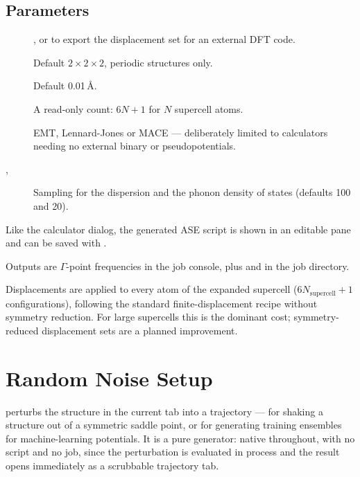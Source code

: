 \subsection{Parameters}

\begin{description}
  \item[] , or
     to export the
    displacement set for an external DFT code.
  \item[] Default $2\times2\times2$,
    periodic structures only.
  \item[] Default 0.01\,\AA.
  \item[] A read-only count: $6N+1$ for $N$
    supercell atoms.
  \item[] EMT, Lennard-Jones or MACE --- deliberately
    limited to calculators needing no external binary or pseudopotentials.
  \item[, ] Sampling for the dispersion
    and the phonon density of states (defaults 100 and 20).
\end{description}

Like the calculator dialog, the generated ASE script is shown in an
editable pane and can be saved with .

Outputs are $\Gamma$-point frequencies in the job console, plus
 and  in the job directory.

\begin{calnote}
Displacements are applied to every atom of the expanded supercell
($6N_\text{supercell}+1$ configurations), following the standard
finite-displacement recipe without symmetry reduction. For large
supercells this is the dominant cost; symmetry-reduced displacement sets
are a planned improvement.
\end{calnote}

\section{Random Noise Setup}
\label{sec:noise}

\menusep{} perturbs the structure in
the current tab into a trajectory --- for shaking a structure out of a
symmetric saddle point, or for generating training ensembles for
machine-learning potentials. It is a pure generator: native throughout, with
no script and no job, since the perturbation is evaluated in process and the
result opens immediately as a scrubbable trajectory tab.

